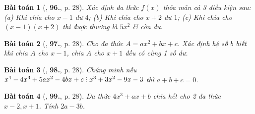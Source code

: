 \documentclass{article}
\numberwithin{equation}{section}
\newtheorem{baitoan}{Bài toán}
\DeclareRobustCommand{\divby}{%
	\mathrel{\vbox{\baselineskip.65ex\lineskiplimit0pt\hbox{.}\hbox{.}\hbox{.}}}%
}
\begin{document}
\begin{baitoan}[\cite{Tuyen_Toan_8}, \textbf{96.}, p. 28]
	Xác định đa thức $f(x)$ thỏa mãn cả 3 điều kiện sau: (a) Khi chia cho $x - 1$ dư $4$; (b) Khi chia cho $x + 2$ dư $1$; (c) Khi chia cho $(x - 1)(x + 2)$ thì được thương là $5x^2$ \& còn dư.
\end{baitoan}

\begin{baitoan}[\cite{Tuyen_Toan_8}, \textbf{97.}, p. 28]
	Cho đa thức $A = ax^2 + bx + c$. Xác định hệ số $b$ biết khi chia $A$ cho $x - 1$, chia $A$ cho $x + 1$ đều có cùng 1 số dư.
\end{baitoan}

\begin{baitoan}[\cite{Tuyen_Toan_8}, \textbf{98.}, p. 28]
	Chứng minh nếu $x^4 - 4x^3 + 5ax^2 - 4bx + c\divby x^3 + 3x^2 - 9x - 3$ thì $a + b + c = 0$.
\end{baitoan}

\begin{baitoan}[\cite{Tuyen_Toan_8}, \textbf{99.}, p. 28]
	Đa thức $4x^3 + ax + b$ chia hết cho 2 đa thức $x - 2,x + 1$. Tính $2a - 3b$.
\end{baitoan}

\end{document}
